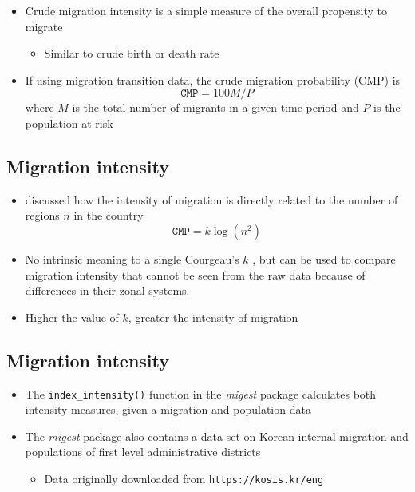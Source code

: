 \documentclass[
]{book}
\providecommand{\tightlist}{%
  \setlength{\itemsep}{0pt}\setlength{\parskip}{0pt}}
\begin{document}
\begin{itemize}
\tightlist
\item
  Crude migration intensity is a simple measure of the overall propensity to migrate

  \begin{itemize}
  \tightlist
  \item
    Similar to crude birth or death rate
  \end{itemize}
\item
  If using migration transition data, the crude migration probability (CMP) is
  \[
  \texttt{CMP} = 100 M/P
  \]
  where \(M\) is the total number of migrants in a given time period and \(P\) is the population at risk
\end{itemize}

\hypertarget{migration-intensity-1}{%
\subsection{Migration intensity}\label{migration-intensity-1}}

\begin{itemize}
\tightlist
\item
  \citet{Courgeau1973} discussed how the intensity of migration is directly related to the number of regions \(n\) in the country
  \[
  \texttt{CMP} = k \log (n^2)
  \]
\item
  No intrinsic meaning to a single Courgeau's \(k\) , but can be used to compare migration intensity that cannot be seen from the raw data because of differences in their zonal systems.
\item
  Higher the value of \(k\), greater the intensity of migration
\end{itemize}

\hypertarget{migration-intensity-2}{%
\subsection{Migration intensity}\label{migration-intensity-2}}

\begin{itemize}
\tightlist
\item
  The \texttt{index\_intensity()} function in the \emph{migest} package calculates both intensity measures, given a migration and population data
\item
  The \emph{migest} package also contains a data set on Korean internal migration and populations of first level administrative districts

  \begin{itemize}
  \tightlist
  \item
    Data originally downloaded from \texttt{https://kosis.kr/eng}
  \end{itemize}
\end{itemize}
\end{document}
